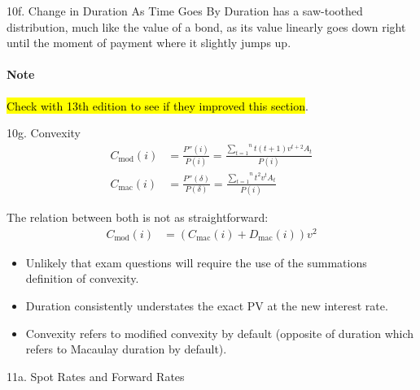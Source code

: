 \begin{CHPT_SUMM_AUTO}[label = {L.-10f}]{10f. Change in Duration As Time Goes By}
Duration has a saw-toothed distribution, much like the value of a bond, as its value linearly goes down right until the moment of payment where it slightly jumps up.

\paragraph{Note}	\hl{Check with 13th edition to see if they improved this section}.
\end{CHPT_SUMM_AUTO}

\begin{CHPT_SUMM_AUTO}[label = {L.-10g}]{10g. Convexity}
\begin{align*}
	C_{\text{mod}}(i)
	&=	\frac{P''(i)}{P(i)}
	=	\frac{\overset{n}{\underset{t = 1}{\sum}} t (t + 1) v^{t + 2} A_{t}}{P(i)}	\\
	C_{\text{mac}}(i)
	&=	\frac{P''(\delta)}{P(\delta)}
	=	\frac{\overset{n}{\underset{t = 1}{\sum}} t^{2} v^{t} A_{t}}{P(i)}
\end{align*}

The relation between both is not as straightforward:
\begin{align*}
	C_{\text{mod}}(i)
	&=	(C_{\text{mac}}(i) + D_{\text{mac}}(i))v^{2}
\end{align*}

\begin{itemize}[leftmargin = *]
	\item	Unlikely that exam questions will require the use of the summations definition of convexity.
	\item	Duration consistently understates the exact PV at the new interest rate.
	\item	Convexity refers to modified convexity by default (opposite of duration which refers to Macaulay duration by default).
\end{itemize}
\end{CHPT_SUMM_AUTO}

\begin{CHPT_SUMM_AUTO}[label = {L.-11a}]{11a. Spot Rates and Forward Rates}

\end{CHPT_SUMM_AUTO}

